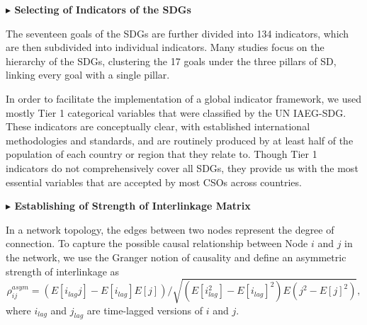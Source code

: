 \documentclass[12pt]{article}  %
\begin{document}
\vspace{0.7mm}\begin{itshape}
\textbf{$\blacktriangleright$ Selecting of Indicators of the SDGs}\end{itshape}


The seventeen goals of the SDGs are further divided into 134 indicators, which are then subdivided into individual indicators. Many studies focus on the hierarchy of the SDGs, clustering
the 17 goals under the three pillars of SD, linking every goal with a single pillar. 

In order to facilitate the implementation of a global indicator framework, we used mostly Tier 1 categorical variables that were classified by the UN IAEG-SDG. These indicators are conceptually clear, with established international methodologies and standards, and are routinely produced by at least half of the population of each country or region that they relate to. Though Tier 1 indicators do not comprehensively cover all SDGs, they provide us with the most essential variables that are accepted by most CSOs across countries.

\vspace{0.7mm}\begin{itshape}
\textbf{$\blacktriangleright$ Establishing of Strength of Interlinkage Matrix }\end{itshape}

In a network topology, the edges between two nodes represent the degree of connection.  To capture the possible causal relationship between Node $i$ and $j$ in the network, we  use
the Granger notion of causality and define an asymmetric strength
of interlinkage as 
\begin{equation}
\rho _{ij}^{asym}=\left( E\left[ i_{lag}j \right] -E\left[ i_{lag} \right] E\left[ j \right] \right) /\sqrt{\left( E\left[ i_{lag}^{2} \right] -E\left[ i_{lag} \right] ^2 \right) E\left( j^2-E\left[ j \right] ^2 \right)},
\label{eq:3.1}
\end{equation}
where $i_{lag}$ and $j_{lag}$ are time-lagged versions of $i$ and $j$.
\end{document}
